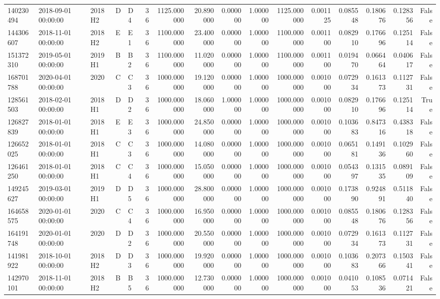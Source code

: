 \begin{tabular}{lllllrrrrrrrrrrr}
140230494 & 2018-09-01 00:00:00 & 2018H2 & D & D4 & 36 & 1125.000000 & 20.890000 & 0.000000 & 1.000000 & 1125.000000 & 0.001125 & 0.085548 & 0.180676 & 0.128356 & False \\
144306607 & 2018-11-01 00:00:00 & 2018H2 & E & E1 & 36 & 1100.000000 & 23.400000 & 0.000000 & 1.000000 & 1100.000000 & 0.001100 & 0.082910 & 0.176696 & 0.125114 & False \\
151372310 & 2019-05-01 00:00:00 & 2019H1 & B & B2 & 36 & 1100.000000 & 11.020000 & 0.000000 & 1.000000 & 1100.000000 & 0.001100 & 0.019470 & 0.066464 & 0.040617 & False \\
168701788 & 2020-04-01 00:00:00 & 2020 & C & C3 & 36 & 1000.000000 & 19.120000 & 0.000000 & 1.000000 & 1000.000000 & 0.001000 & 0.072934 & 0.161373 & 0.112731 & False \\
128561503 & 2018-02-01 00:00:00 & 2018H1 & D & D2 & 36 & 1000.000000 & 18.060000 & 1.000000 & 1.000000 & 1000.000000 & 0.001000 & 0.082910 & 0.176696 & 0.125114 & True \\
126827839 & 2018-01-01 00:00:00 & 2018H1 & E & E3 & 36 & 1000.000000 & 24.850000 & 0.000000 & 1.000000 & 1000.000000 & 0.001000 & 0.103683 & 0.847316 & 0.438318 & False \\
126652025 & 2018-01-01 00:00:00 & 2018H1 & C & C3 & 36 & 1000.000000 & 14.080000 & 0.000000 & 1.000000 & 1000.000000 & 0.001000 & 0.065181 & 0.149136 & 0.102960 & False \\
126461250 & 2018-01-01 00:00:00 & 2018H1 & C & C4 & 36 & 1000.000000 & 15.050000 & 0.000000 & 1.000000 & 1000.000000 & 0.001000 & 0.054397 & 0.131535 & 0.089109 & False \\
149245627 & 2019-03-01 00:00:00 & 2019H1 & D & D5 & 36 & 1000.000000 & 28.800000 & 0.000000 & 1.000000 & 1000.000000 & 0.001000 & 0.173890 & 0.924891 & 0.511840 & False \\
164658575 & 2020-01-01 00:00:00 & 2020 & C & C4 & 36 & 1000.000000 & 16.950000 & 0.000000 & 1.000000 & 1000.000000 & 0.001000 & 0.085548 & 0.180676 & 0.128356 & False \\
164191748 & 2020-01-01 00:00:00 & 2020 & D & D2 & 36 & 1000.000000 & 20.550000 & 0.000000 & 1.000000 & 1000.000000 & 0.001000 & 0.072934 & 0.161373 & 0.112731 & False \\
141981922 & 2018-10-01 00:00:00 & 2018H2 & D & D3 & 36 & 1000.000000 & 19.920000 & 0.000000 & 1.000000 & 1000.000000 & 0.001000 & 0.103683 & 0.207366 & 0.150341 & False \\
142970101 & 2018-11-01 00:00:00 & 2018H2 & B & B5 & 36 & 1000.000000 & 12.730000 & 0.000000 & 1.000000 & 1000.000000 & 0.001000 & 0.041053 & 0.108536 & 0.071421 & False \\

\end{tabular}
